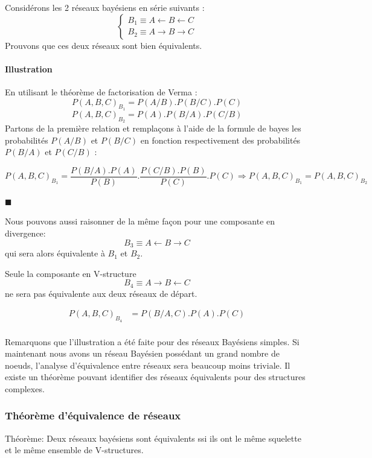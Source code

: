 \documentclass[a4paper]{article}
\begin{document}
Considérons les 2 réseaux bayésiens  en série suivants :
\[
\left\lbrace 
\begin{array}{lcl} 
B_1 \equiv A \longleftarrow B \longleftarrow C\\
B_2 \equiv A \longrightarrow B \longrightarrow C
\end{array}\right.
\]
Prouvons que ces deux réseaux sont bien équivalents.

\paragraph{Illustration}

En utilisant le théorème de factorisation de Verma : 
\[
P(A,B,C)_{B_{1}}=P(A / B).P(B/ C).P(C)
\]
$$P(A,B,C)_{B_{2}}=P(A).P(B / A).P(C / B)$$
Partons de la première relation et remplaçons à l'aide de la formule de bayes les probabilités  $P(A/B)$ et $P(B/C)$ en fonction respectivement des probabilités  $P(B/A)$ et $P(C/B)$ :

$$ P(A,B,C)_{B_{1}}=\frac{P(B/A).P(A)}{P(B)} .\frac{P(C/B).P(B)}{P(C)}.P(C)  \Longrightarrow  P(A,B,C)_{B_{1}}=P(A,B,C)_{B_{2}}$$

$\blacksquare$

Nous pouvons aussi  raisonner de la même façon pour une composante en divergence:
$$B_{3}\equiv A \longleftarrow B \longrightarrow C$$
qui sera alors équivalente à $B_{1}$ et $B_{2}$.

Seule la composante en V-structure 
$$B_{4}\equiv A \longrightarrow B \longleftarrow C$$
ne sera pas équivalente aux deux réseaux de départ.

\begin{align*}
P(A,B,C)_{B_{4}}&=P(B/A,C).P(A).P(C)\\
\end{align*}

Remarquons que l'illustration a été faite pour des réseaux Bayésiens simples.
Si maintenant nous avons un réseau Bayésien possédant  un grand nombre de noeuds,
l'analyse d'équivalence entre réseaux sera beaucoup moins triviale.
Il existe un théorème pouvant identifier des réseaux équivalents pour des structures complexes. 




\subsubsection{Théorème d'équivalence de réseaux}
\begin{theorem}{Théorème:}
  Deux réseaux bayésiens sont équivalents ssi ils ont le même squelette et le même ensemble de V-structures.
\end{theorem}
\end{document}

